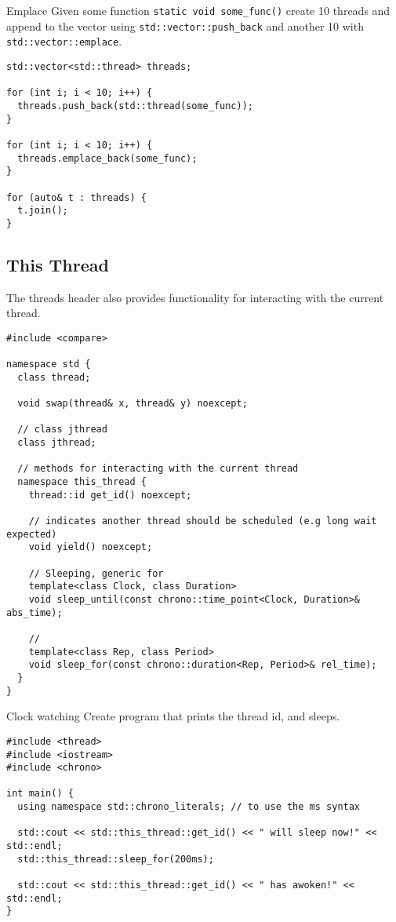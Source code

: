 \begin{examplebox}{Emplace}
  Given some function \texttt{static void some_func()} create 10 threads and append to the vector using \texttt{std::vector::push_back} and another 10 with \texttt{std::vector::emplace}.
  \tcblower
  \begin{verbatim}
std::vector<std::thread> threads;

for (int i; i < 10; i++) {
  threads.push_back(std::thread(some_func));
}

for (int i; i < 10; i++) {
  threads.emplace_back(some_func);
}

for (auto& t : threads) {
  t.join();
}    
  \end{verbatim}
\end{examplebox}

\subsection{This Thread}
The threads header also provides functionality for interacting with the current thread.
\begin{verbatim}
#include <compare>

namespace std {
  class thread;
  
  void swap(thread& x, thread& y) noexcept;
  
  // class jthread
  class jthread;
  
  // methods for interacting with the current thread
  namespace this_thread {
    thread::id get_id() noexcept;

    // indicates another thread should be scheduled (e.g long wait expected)
    void yield() noexcept;

    // Sleeping, generic for  
    template<class Clock, class Duration>
    void sleep_until(const chrono::time_point<Clock, Duration>& abs_time);

    //
    template<class Rep, class Period>
    void sleep_for(const chrono::duration<Rep, Period>& rel_time);
  }
}
\end{verbatim}
\begin{examplebox}{Clock watching}
  Create program that prints the thread id, and sleeps.
  \tcblower
  \begin{verbatim}
#include <thread>
#include <iostream>
#include <chrono>

int main() {
  using namespace std::chrono_literals; // to use the ms syntax

  std::cout << std::this_thread::get_id() << " will sleep now!" << std::endl;
  std::this_thread::sleep_for(200ms);

  std::cout << std::this_thread::get_id() << " has awoken!" << std::endl;
}
  \end{verbatim}
\end{examplebox}


